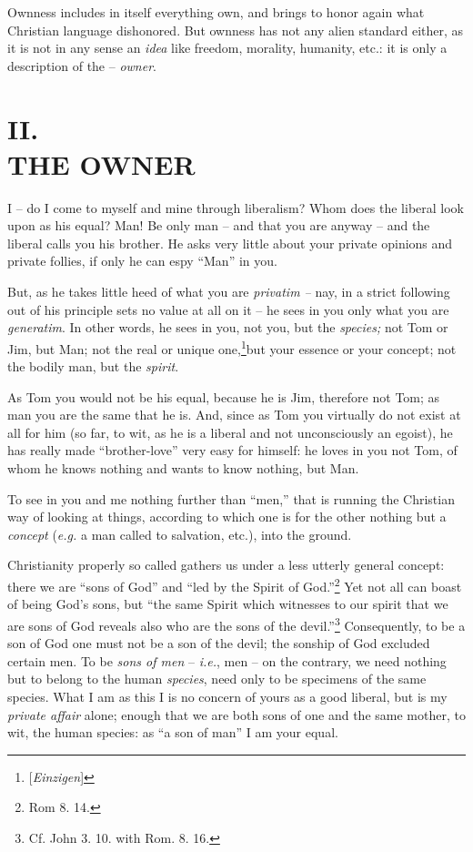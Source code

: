 \documentclass[12pt,a4paper]{book}
\begin{document}
Ownness includes in itself everything own, and brings to honor again what 
Christian language dishonored. But ownness has not any alien standard either, 
as it is not in any sense an \textit{idea} like freedom, morality, humanity, 
etc.: it is only a description of the -- \textit{owner}.

\chapter[II. The Owner]{\centering II.\\
THE OWNER}

I -- do I come to myself and mine through liberalism? Whom does the liberal 
look upon as his equal? Man! Be only man -- and that you are anyway -- and the 
liberal calls you his brother. He asks very little about your private opinions 
and private follies, if only he can espy ``Man'' in you.

But, as he takes little heed of what you are \textit{privatim --} nay, in a 
strict following out of his principle sets no value at all on it -- he sees in 
you only what you are \textit{generatim}. In other words, he sees in you, not 
you, but the \textit{species;} not Tom or Jim, but Man; not the real or unique 
one,\footnote{[\textit{Einzigen}] }but your essence or your concept; not the 
bodily man, but the \textit{spirit}.

As Tom you would not be his equal, because he is Jim, therefore not Tom; as 
man you are the same that he is. And, since as Tom you virtually do not exist 
at all for him (so far, to wit, as he is a liberal and not unconsciously an 
egoist), he has really made ``brother-love'' very easy for himself: he loves 
in you not Tom, of whom he knows nothing and wants to know nothing, but Man.

To see in you and me nothing further than ``men,'' that is running the 
Christian way of looking at things, according to which one is for the other 
nothing but a \textit{concept} (\textit{e.g.} a man called to salvation, 
etc.), into the ground.

Christianity properly so called gathers us under a less utterly general 
concept: there we are ``sons of God'' and ``led by the Spirit of 
God.''\footnote{Rom 8. 14.} Yet not all can boast of being God's sons, but 
``the same Spirit which witnesses to our spirit that we are sons of God 
reveals also who are the sons of the devil.''\footnote{Cf. John 3. 10. with 
Rom. 8. 16.} Consequently, to be a son of God one must not be a son of the 
devil; the sonship of God excluded certain men. To be \textit{sons of men} -- 
\textit{i.e.}, men -- on the contrary, we need nothing but to belong to the 
human \textit{species}, need only to be specimens of the same species. What I 
am as this I is no concern of yours as a good liberal, but is my 
\textit{private affair} alone; enough that we are both sons of one and the 
same mother, to wit, the human species: as ``a son of man'' I am your equal.
\end{document}
